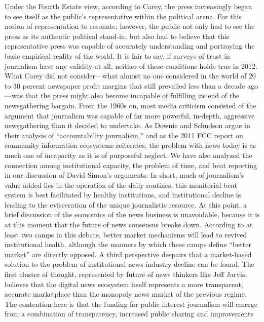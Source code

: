 Under the Fourth Estate view, according to Carey, the press increasingly began to
see itself as the public’s representative within the political arena. For this notion of
representation to resonate, however, the public not only had to see the press as its
authentic political stand-in, but also had to believe that this representative press
was capable of accurately understanding and portraying the basic empirical reality
of the world. It is fair to say, if surveys of trust in journalism have any validity
at all, neither of these conditions holds true in 2012.
What Carey did not consider—what almost no one considered in the world of
20 to 30 percent newspaper profit margins that still prevailed less than a decade
ago—was that the press might also become incapable of fulfilling its end of the
newsgathering bargain. From the 1960s on, most media criticism consisted of the
argument that journalism was capable of far more powerful, in-depth, aggressive
newsgathering than it decided to undertake. As Downie and Schudson argue
in their analysis of ``accountability journalism,'' and as the 2011 FCC report on
community information ecosystems reiterates, the problem with news today is as
much one of incapacity as it is of purposeful neglect. We have also analyzed the
connection among institutional capacity, the problem of time, and beat reporting
in our discussion of David Simon’s arguments: In short, much of journalism’s
value added lies in the operation of the daily routines, this monitorial beat system
is best facilitated by healthy institutions, and institutional decline is leading to the
evisceration of the unique journalistic resource.
At this point, a brief discussion of the economics of the news business is unavoidable,
because it is at this moment that the future of news consensus breaks down.
According to at least two camps in this debate, better market mechanisms will
lead to revived institutional health, although the manners by which these camps
define ``better market'' are directly opposed. A third perspective despairs that a
market-based solution to the problem of institutional news industry decline can
be found.
The first cluster of thought, represented by future of news thinkers like Jeff Jarvis,
believes that the digital news ecosystem itself represents a more transparent, accurate
marketplace than the monopoly news market of the previous regime. The
contention here is that the funding for public interest journalism will emerge
from a combination of transparency, increased public sharing and improvements

